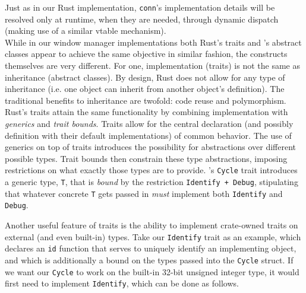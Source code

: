 Just  as in  our  Rust  implementation, \texttt{conn}'s  implementation
details will be resolved only at  runtime, when they are needed, through dynamic
dispatch (making use of a similar vtable mechanism).\\


While  in our  window  manager  implementations both  Rust's  traits and  \cpp's
abstract  classes appear  to  achieve  the same  objective  in similar  fashion,
the  constructs   themselves  are   very  different.  For   one,  implementation
(traits)  is  not  the  same  as  inheritance  (abstract  classes).  By  design,
Rust  does  not  allow  for  any  type  of  inheritance  (i.e.  one  object  can
inherit  from   another  object's  definition).  The   traditional  benefits  to
inheritance are twofold:  code reuse and polymorphism. Rust's  traits attain the
same  functionality  by  combining  implementation  with  \textit{generics}  and
\textit{trait  bounds}\cite{therustbook, rustblogtraits}.  Traits allow  for the
central declaration (and possibly definition with their default implementations)
of  common behavior\cite{therustbook,  rustblogtraits}. The  use of  generics on
top  of  traits  introduces  the possibility  for  abstractions  over  different
possible  types\cite{therustbook, rustblogtraits}.  Trait bounds  then constrain
these  type abstractions,  imposing  restrictions on  what  exactly those  types
are  to  provide\cite{therustbook,  rustblogtraits,  therustreference}.  \wmrs's
\texttt{Cycle} trait introduces  a generic type, \texttt{T},
that  is   \textit{bound}  by   the  restriction   \texttt{Identify  +
Debug},   stipulating   that   whatever   concrete   \texttt{T}   gets
passed   in  \textit{must}   implement   both  \texttt{Identify}   and
\texttt{Debug}.

Another useful feature of traits is  the ability to implement crate-owned traits
on  external (and  even  built-in) types.  Take our  \texttt{Identify}
trait  as an  example,  which declares  an  \texttt{id} function  that
serves to uniquely identify an implementing  object, and which is additionally a
bound on the  types passed into the \texttt{Cycle} struct.  If we want
our \texttt{Cycle}  to work  on the  built-in 32-bit  unsigned integer
type, it would first need to implement \texttt{Identify}, which can be
done as follows.

